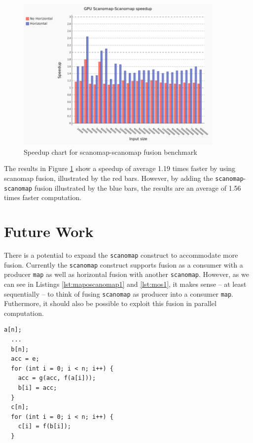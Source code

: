 \documentclass[11pt,bibliography=totocnumbered]{article}
\begin{document}
\begin{figure}[hb]
  \centering
    \includegraphics[width=0.9\textwidth]{images/horri-comparing.png}
  \caption{Speedup chart for scanomap-scanomap fusion benchmark}
  \label{fig:scanomap-scanomap}
\end{figure}

The results in Figure \ref{fig:scanomap-scanomap} show a speedup of average 1.19 times faster by using scanomap fusion, illustrated by the red bars. However, by adding the \texttt{scanomap}-\texttt{scanomap} fusion illustrated by the blue bars, the results are an average of 1.56 times faster computation.

\clearpage
\newpage
\section{Future Work}
There is a potential to expand the \texttt{scanomap} construct to accommodate more fusion. Currently the \texttt{scanomap} construct supports fusion as a consumer with a producer \texttt{map} as well
 as horizontal fusion with another \texttt{scanomap}. However, as we can see in Listings \ref{lst:maposcanomap1} and \ref{lst:mos1}, it makes sense
 -- at least sequentially -- to think of fusing \texttt{scanomap} as producer into
 a consumer \texttt{map}. Futhermore, it should also be possible to exploit this fusion in parallel computation.

\begin{lstlisting}[caption=$\mathtt{scanomap} \: g \: g_f \: ne \: a$ and $\mathtt{map} \: h \: b$ as sequential loops., label={lst:maposcanomap1}]
  a[n];
  ...
  b[n];
  acc = e;
  for (int i = 0; i < n; i++) {
    acc = g(acc, f(a[i]));
    b[i] = acc;
  }
  c[n];
  for (int i = 0; i < n; i++) {
    c[i] = f(b[i]);
  }
\end{lstlisting}
\end{document}
